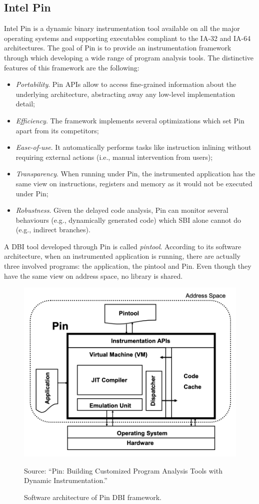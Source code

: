 \documentclass[LaM,binding=0.6cm]{sapthesis}
\newcommand{\source}[1]{\caption*{Source: {#1}} }
\begin{document}
\subsection{Intel Pin}
Intel Pin is a dynamic binary instrumentation tool available on all the major operating systems and supporting executables compliant to the IA-32 and IA-64 architectures. The goal of Pin is to provide an instrumentation framework through which developing a wide range of program analysis tools. The distinctive features of this framework are the following:
\begin{itemize}
\item \textit{Portability}. Pin APIs allow to access fine-grained information about the underlying architecture, abstracting away any low-level implementation detail;
\item \textit{Efficiency}. The framework implements several optimizations which set Pin apart from its competitors;
\item \textit{Ease-of-use}. It automatically performs tasks like instruction inlining without requiring external actions (i.e., manual intervention from users);
\item \textit{Transparency}. When running under Pin, the instrumented application has the same view on instructions, registers and memory as it would not be executed under Pin;
\item \textit{Robustness}. Given the delayed code analysis, Pin can monitor several behaviours (e.g., dynamically generated code) which SBI alone cannot do (e.g., indirect branches).
\end{itemize}
A DBI tool developed through Pin is called \textit{pintool}. According to its software architecture, when an instrumented application is running, there are actually three involved programs: the application, the pintool and Pin. Even though they have the same view on address space, no library is shared.

\begin{figure}[h!]
\centering
\includegraphics[scale=.7]{images/techn7}
\caption{Software architecture of Pin DBI framework.}
\source{``Pin: Building Customized Program Analysis Tools with Dynamic Instrumentation.''}
\end{figure}
\newpage
\end{document}
